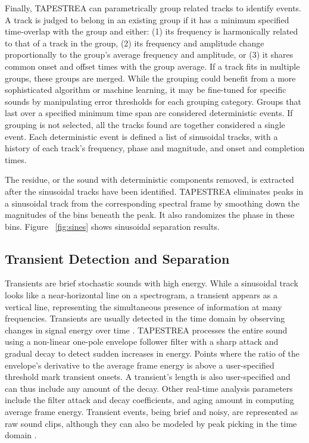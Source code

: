 \documentclass[a4paper]{article}
\begin{document}
Finally, TAPESTREA can parametrically group related tracks \cite{Ellis94,Melih00} 
to identify events. A track is judged to belong in an existing group if it has a 
minimum specified time-overlap with the group and either: (1) its frequency is harmonically 
related to that of a track in the group, (2) its frequency and amplitude 
change proportionally to the group's average frequency and amplitude, 
or (3) it shares common onset and offset times with the group average. If a track 
fits in multiple groups, these groups are merged. While the grouping could 
benefit from a more sophisticated algorithm or machine learning, it may be 
fine-tuned for specific sounds by manipulating error thresholds for each grouping 
category. Groups that last over a specified minimum time span are considered 
deterministic events. If grouping is not selected, all 
the tracks found are together considered a single event. Each deterministic 
event is defined a list of sinusoidal tracks, with 
a history of each track's frequency, phase and magnitude, and onset and completion times. 

The residue, or the sound with deterministic components removed, is extracted 
after the sinusoidal tracks have been identified. TAPESTREA eliminates 
peaks in a sinusoidal track from the corresponding 
spectral frame by smoothing down the magnitudes of the bins beneath the peak. 
It also randomizes the phase in these bins. Figure ~\ref{fig:sines} shows sinusoidal 
separation results. 

\subsection{Transient Detection and Separation}

Transients are brief stochastic sounds with high energy. While a sinusoidal track 
looks like a near-horizontal line on a spectrogram, a transient 
appears as a vertical line, representing the simultaneous presence of information 
at many frequencies. Transients are usually detected in the time domain by observing 
changes in signal energy over time \cite{Verma98,Bello05}. 
TAPESTREA processes the entire sound
using a non-linear one-pole envelope follower filter with a sharp attack and gradual 
decay to detect sudden increases in energy. Points where the ratio of the envelope's derivative 
to the average frame energy is above a user-specified threshold mark transient onsets. A transient's length  
is also user-specified and can thus include any amount of the decay. Other real-time analysis parameters 
include the filter attack and decay coefficients, and aging amount in computing average frame energy.
Transient events, being brief and noisy, are represented as raw sound clips, although they can also be modeled 
by peak picking in the time domain \cite{Verma98}.
\end{document}
